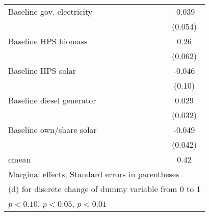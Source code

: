 \begin{table}[htbp]
\begin{tabular*}{1\hsize}{@{\hskip\tabcolsep\extracolsep\fill}l*{5}{c}}
Baseline gov. electricity&                  &                  &                  &                  &   -0.039         \\
                &                  &                  &                  &                  &  (0.054)         \\
Baseline HPS biomass&                  &                  &                  &                  &     0.26\sym{***}\\
                &                  &                  &                  &                  &  (0.062)         \\
Baseline HPS solar&                  &                  &                  &                  &   -0.046         \\
                &                  &                  &                  &                  &   (0.10)         \\
Baseline diesel generator&                  &                  &                  &                  &    0.029         \\
                &                  &                  &                  &                  &  (0.032)         \\
Baseline own/share solar&                  &                  &                  &                  &   -0.049         \\
                &                  &                  &                  &                  &  (0.042)         \\
\midrule
cmean           &                  &                  &                  &                  &     0.42         \\
\bottomrule
\multicolumn{6}{l}{\footnotesize Marginal effects; Standard errors in parentheses}\\
\multicolumn{6}{l}{\footnotesize  (d) for discrete change of dummy variable from 0 to 1}\\
\multicolumn{6}{l}{\footnotesize \sym{*} \(p<0.10\), \sym{**} \(p<0.05\), \sym{***} \(p<0.01\)}\\
\end{tabular*}
\end{table}
